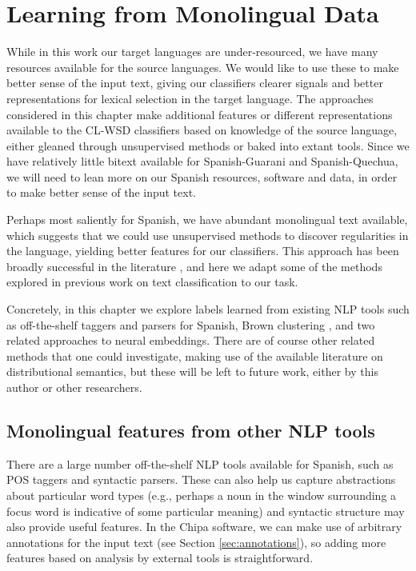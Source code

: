 \chapter{Learning from Monolingual Data}
\label{chap:monolingual}
While in this work our target languages are under-resourced, we have many
resources available for the source languages. We would like to use these to
make better sense of the input text, giving our classifiers clearer signals and
better representations for lexical selection in the target language. The
approaches considered in this chapter make additional features or different
representations available to the CL-WSD classifiers based on knowledge of the
source language, either gleaned through unsupervised methods or baked into
extant tools. Since we have relatively little bitext available for
Spanish-Guarani and Spanish-Quechua, we will need to lean more on our Spanish
resources, software and data, in order to make better sense of the input text.

Perhaps most saliently for Spanish, we have abundant monolingual text
available, which suggests that we could use unsupervised methods to discover
regularities in the language, yielding better features for our classifiers.
This approach has been broadly successful in the literature
\cite{turian-ratinov-bengio:2010:ACL}
, and here we adapt some of the methods explored in previous work on text
classification to our task.

Concretely, in this chapter we explore labels learned from existing NLP tools
such as off-the-shelf taggers and parsers for Spanish, Brown clustering
\cite{brown1992class}, and two related approaches to neural embeddings. There
are of course other related methods that one could investigate, making use of
the available literature on distributional semantics, but these will be left to
future work, either by this author or other researchers.

\section{Monolingual features from other NLP tools}
There are a large number off-the-shelf NLP tools available for Spanish, such as
POS taggers and syntactic parsers. These can also help us capture abstractions
about particular word types (e.g., perhaps a noun in the window surrounding a
focus word is indicative of some particular meaning) and syntactic structure
may also provide useful features.  In the Chipa software, we can make use of
arbitrary annotations for the input text (see Section \ref{sec:annotations}),
so adding more features based on analysis by external tools is straightforward.

